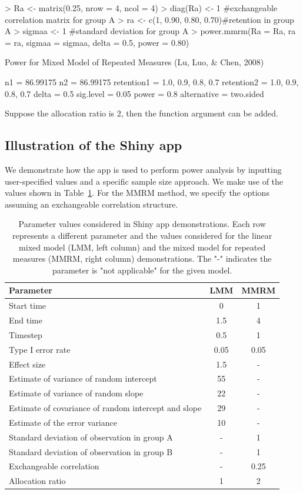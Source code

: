 \begin{example}
> Ra <- matrix(0.25, nrow = 4, ncol = 4)
> diag(Ra) <- 1 #exchangeable correlation matrix for group A
> ra <- c(1, 0.90, 0.80, 0.70)#retention in group A
> sigmaa <- 1 #standard deviation for group A
> power.mmrm(Ra = Ra, ra = ra, sigmaa = sigmaa, delta = 0.5, power = 0.80)

Power for Mixed Model of Repeated Measures (Lu, Luo, & Chen, 2008) 

n1 = 86.99175
n2 = 86.99175
retention1 = 1.0, 0.9, 0.8, 0.7
retention2 = 1.0, 0.9, 0.8, 0.7
delta = 0.5
sig.level = 0.05
power = 0.8
alternative = two.sided
\end{example}
Suppose the allocation ratio is 2, then the function argument  can be added. 

\subsection{Illustration of the Shiny app}
We demonstrate how the app is used to perform power analysis by inputting user-specified values and a specific sample size approach. We make use of the values shown in Table~\ref{parameters}. For the MMRM method, we specify the options assuming an exchangeable correlation structure.  

\begin{table}[ht]
	\caption{Parameter values considered in Shiny app demonstrations. Each row represents a different parameter and the values considered for the linear mixed model (LMM, left column) and the mixed model for repeated measures (MMRM, right column) demonstrations. The "-" indicates the parameter is "not applicable" for the given model.}\label{parameters}
	\begin{tabular}{lcc}
		\hline\hline
		Parameter&	LMM&	MMRM\\
		\hline
		Start time&	0&1\\	
		End time&	1.5	&4\\
		Timestep&	0.5	&1\\
		Type I error rate&	0.05&0.05	\\
		Effect size	&1.5&-	\\
		Estimate of variance of random intercept&	55	&-\\
		Estimate of variance of random slope&	22&	-\\
		Estimate of covariance of random intercept and slope&	29	&- \\
		Estimate of the error variance&	10	&-\\
		Standard deviation of observation in group A&	-&	1\\
		Standard deviation of observation in group B&	-&	1\\
		Exchangeable correlation&-&		0.25\\
		Allocation ratio&	1&2	\\
		\hline\hline
	\end{tabular}
\end{table}
	
